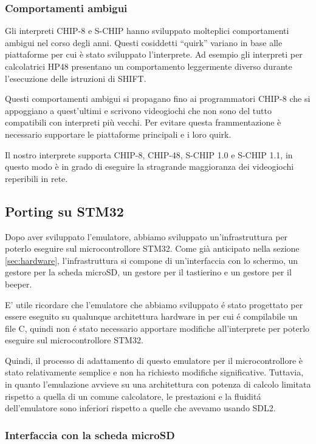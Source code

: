 \documentclass[a4paper]{article}
\begin{document}
\subsubsection{Comportamenti ambigui}

Gli interpreti CHIP-8 e S-CHIP hanno sviluppato molteplici comportamenti ambigui nel corso degli anni. Questi cosiddetti ``quirk'' variano in base alle piattaforme per cui è stato sviluppato l'interprete. Ad esempio gli interpreti per calcolatrici HP48 presentano un comportamento leggermente diverso durante l'esecuzione delle istruzioni di SHIFT.

Questi comportamenti ambigui si propagano fino ai programmatori
CHIP-8 che si appoggiano a quest'ultimi e scrivono videogiochi che
non sono del tutto compatibili con interpreti più vecchi. Per evitare
questa frammentazione è necessario supportare le piattaforme
principali e i loro quirk.

Il nostro interprete supporta CHIP-8, CHIP-48, S-CHIP 1.0 e
S-CHIP 1.1, in questo modo è in grado di eseguire la stragrande
maggioranza dei videogiochi reperibili in rete.

\subsection{Porting su STM32}

Dopo aver sviluppato l'emulatore, abbiamo sviluppato un'infrastruttura per poterlo eseguire sul microcontrollore STM32.
Come già anticipato nella sezione \ref{sec:hardware}, l'infrastruttura si compone di un'interfaccia con lo schermo, un gestore per la scheda microSD, un gestore per il tastierino e un gestore per il beeper.

E' utile ricordare che l'emulatore che abbiamo sviluppato é stato progettato per essere eseguito su qualunque architettura hardware in per cui é compilabile un file C, quindi non é stato necessario apportare modifiche all'interprete per poterlo eseguire sul microcontrollore STM32.

Quindi, il processo di adattamento di questo emulatore per il microcontrollore è stato relativamente semplice e non ha richiesto modifiche significative. Tuttavia, in quanto l'emulazione avvieve su una architettura con potenza di calcolo limitata rispetto a quella di un comune calcolatore, le prestazioni e la fluiditá dell'emulatore sono inferiori rispetto a quelle che avevamo usando SDL2.

\subsubsection{Interfaccia con la scheda microSD}
\end{document}

